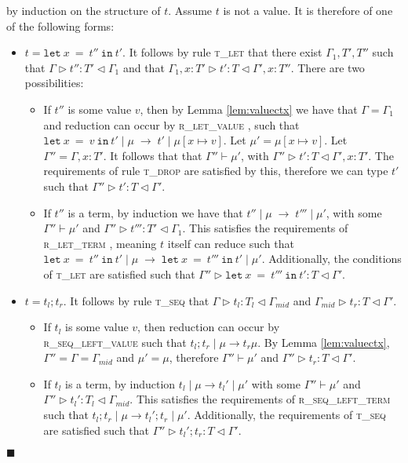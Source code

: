 \documentclass[preprint]{sigplanconf}
\newcommand{\lemref}[1]{Lemma \ref{#1}}
\newcommand{\rlett}{\textsc{r\_let\_term} }
\newcommand{\rletv}{\textsc{r\_let\_value} }
\newcommand{\rseqlt}{\textsc{r\_seq\_left\_term} }
\newcommand{\rseqlv}{\textsc{r\_seq\_left\_value} }
\newcommand{\tlet}{\textsc{t\_let} }
\newcommand{\tseq}{\textsc{t\_seq} }
\newcommand{\tdrop}{\textsc{t\_drop} }
\newcommand{\typerule}[4]{#1 \triangleright #2 : #3 \triangleleft #4}
\newcommand{\oprule}[4]{#1 \mid #2\;\longrightarrow\;#3 \mid #4}
\newcommand{\lett}[3]{\mathtt{let}\:#1\:\mathtt{=}\:#2\:\mathtt{in}\:#3}
\newcommand{\qed}{$\blacksquare$}
\newenvironment{proof}{\vspace{1ex}\noindent{\bf Proof}\hspace{0.5em}}
  {\hfill\qed\vspace{1ex}}
\begin{document}
\begin{proof}
by induction on the structure of $t$. Assume $t$ is not a value. It is
therefore of one of the following forms:

\begin{itemize}
\item $t = \lett{x}{t''}{t'}$. 
It follows by rule \tlet that there exist $\Gamma_1, T', T''$
such that
$\typerule{\Gamma}{t''}{T'}{\Gamma_1}$ and that
$\typerule{\Gamma_1, x : T'}{t'}{T}{\Gamma', x : T''}$. There are two
possibilities:

  \begin{itemize}
  \item If $t''$ is some value $v$, then by \lemref{lem:valuectx} 
  we have that $\Gamma = \Gamma_1$ and reduction can occur
  by \rletv, such that 
  $\oprule{\lett{x}{v}{t'}}{\mu}{t'}{\mu [ x \mapsto v ]}$.
  Let $\mu' = \mu [ x \mapsto v ]$. Let $\Gamma'' = \Gamma, x : T'$.
  It follows that that $\Gamma'' \vdash \mu'$, with
  $\typerule{\Gamma''}{t'}{T}{\Gamma', x : T'}$.
  The requirements of rule \tdrop are satisfied by this, therefore we can 
  type $t'$ such that $\typerule{\Gamma''}{t'}{T}{\Gamma'}$.

  \item If $t''$ is a term, 
  by induction we have that $\oprule{t''}{\mu}{t'''}{\mu'}$, with
  some $\Gamma'' \vdash \mu'$ and $\typerule{\Gamma''}{t'''}{T'}{\Gamma_1}$.
  This satisfies the requirements of \rlett, meaning $t$ itself can reduce
  such that $\oprule{\lett{x}{t''}{t'}}{\mu}{\lett{x}{t'''}{t'}}{\mu'}$.
  Additionally, the conditions of \tlet are satisfied such that
  $\typerule{\Gamma''}{\lett{x}{t'''}{t'}}{T}{\Gamma'}$.

  \end{itemize}

\item $t = t_l ; t_r$. It follows by rule
\tseq that $\typerule{\Gamma}{t_l}{T_l}{\Gamma_{mid}}$ and
$\typerule{\Gamma_{mid}}{t_r}{T}{\Gamma'}$.

  \begin{itemize}
  \item If $t_l$ is some value $v$, then
  reduction can occur by \\ 
  \rseqlv such that
  $t_l; t_r \mid \mu \longrightarrow t_r \mu$. By \lemref{lem:valuectx}, 
  $\Gamma'' = \Gamma = \Gamma_{mid}$
  and $\mu' = \mu$, therefore $\Gamma'' \vdash \mu'$ and 
  $\typerule{\Gamma''}{t_r}{T}{\Gamma'}$.

  \item If $t_l$ is a term, by induction $t_l \mid \mu \longrightarrow t_l' \mid \mu'$
  with some $\Gamma'' \vdash \mu'$ and
  $\typerule{\Gamma''}{t_l'}{T_l}{\Gamma_{mid}}$.
  This satisfies the requirements of \rseqlt
  such that $t_l; t_r \mid \mu \longrightarrow t_l'; t_r \mid \mu'$.
  Additionally, the requirements of \tseq are satisfied such that
  $\typerule{\Gamma''}{t_l'; t_r}{T}{\Gamma'}$.


\end{itemize}
\end{itemize}
\end{proof}
\end{document}
